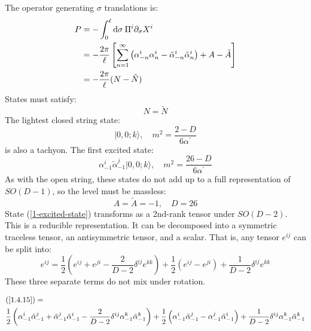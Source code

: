 The operator generating $\sigma$ translations is: 
\begin{equation}
	\begin{aligned}
		P &=-\int_{0}^{\ell} \mathrm{d} \sigma \:\Pi^{i} \partial_{\sigma} X^{i} \\
		&=-\frac{2 \pi}{\ell}\left[\sum_{n=1}^{\infty}\left(\alpha_{-n}^{i} \alpha_{n}^{i}-\tilde{\alpha}_{-n}^{i} \tilde{\alpha}_{n}^{i}\right)+A-\tilde{A}\right] \\
		&=-\frac{2 \pi}{\ell}(N-\tilde{N})
	\end{aligned}
\end{equation}
States must satisfy: 
\begin{equation}
	N=\tilde{N}
\end{equation}
The lightest closed string state: 
\begin{equation}
	|0,0 ; k\rangle, \quad m^{2}=\frac{2-D}{6 \alpha^{\prime}}
\end{equation}
is also a tachyon. 
The first excited state: 
\begin{equation}
	\alpha_{-1}^{i} \tilde{\alpha}_{-1}^{j}|0,0 ; k\rangle, \quad m^{2}=\frac{26-D}{6 \alpha^{\prime}} \label{1-excited-state}
\end{equation}
As with the open string, these states do not add up to a full representation of $SO(D-1)$, so the level must be massless: 
\begin{equation}
	A=\tilde{A}=-1, \quad D=26
\end{equation}
State (\ref{1-excited-state}) transforms as a 2nd-rank tensor under $SO(D-2)$. This is a reducible representation. It can be decomposed into a symmetric traceless tensor, an antisymmetric tensor, and a scalar. 
That is, any tensor $e^{ij}$ can be split into: 
\begin{equation}
	e^{i j}=\frac{1}{2}\left(e^{i j}+e^{j i}-\frac{2}{D-2} \delta^{i j} e^{k k}\right)+\frac{1}{2}\left(e^{i j}-e^{j i}\right)+\frac{1}{D-2} \delta^{i j} e^{k k} \label{1.4.15}
\end{equation}
These three separate terms do not mix under rotation. 
\begin{tcolorbox}
	\begin{remark}
		\begin{align*}
			&(\ref{1.4.15})= \\
			&\frac{1}{2}\left(\alpha_{-1}^{i} \tilde{\alpha}_{-1}^{j}+\tilde{\alpha}_{-1}^{j} \tilde{\alpha}_{-1}^{i}-\frac{2}{D-2} \delta^{i j} \alpha_{-1}^{k} \tilde{\alpha}_{-1}^{k}\right)
			+\frac{1}{2}\left(\alpha_{-1}^{i} \tilde{\alpha}_{-1}^{j}-\alpha_{-1}^{j} \tilde{\alpha}_{-1}^{i}\right)
			+\frac{1}{D-2} \delta^{i j} \alpha_{-1}^{k} \tilde{\alpha}_{-1}^{k} 
		\end{align*}
	\end{remark}
\end{tcolorbox}

